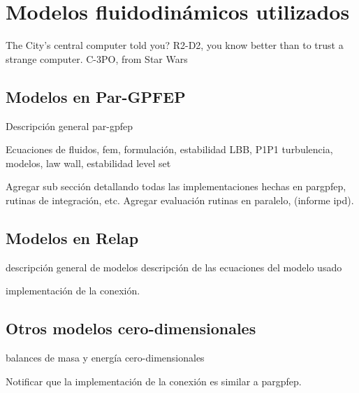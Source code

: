 \chapter{Modelos fluidodinámicos utilizados}
\label{chap3}
\chapterquote
{The City's central computer told you? R2-D2, you know better than to trust a strange computer. }
{C-3PO, from Star Wars}

\section{Modelos en Par-GPFEP}
\label{3:pargpfep}

Descripción general par-gpfep

Ecuaciones de fluidos, 
fem, 
formulación, 
estabilidad LBB, P1P1
turbulencia, modelos, law wall, estabilidad
level set

Agregar sub sección detallando todas las implementaciones hechas en pargpfep, 
rutinas de integración, etc.
Agregar evaluación rutinas en paralelo, (informe ipd).

\section{Modelos en Relap}
\label{3:relap}

descripción general de modelos
descripción de las ecuaciones del modelo usado

implementación de la conexión.

\section{Otros modelos cero-dimensionales}
\label{3:solver0d}

balances de masa y energía cero-dimensionales

Notificar que la implementación de la conexión es similar a pargpfep.
